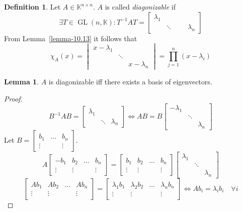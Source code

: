 \documentclass[a4paper,landscape,twocolumn]{article}
\theoremstyle{definition}
\newtheorem{defi}{Definition}
\newtheorem{lemma}{Lemma}
\begin{document}
\begin{defi}
  Let $A \in \mathbb K^{n\times n}$.
  $A$ is called \emph{diagonizable} if
  \[
    \exists T \in \operatorname{GL}(n, \mathbb K):
    T^{-1} AT = \begin{bmatrix}
      \lambda_1 &        & \\
                & \ddots &
                &        & \lambda_n
    \end{bmatrix}
  \]
  From Lemma~\ref{lemma-10.13} it follows that
  \[
    \chi_A(x) = \begin{vmatrix}
      x - \lambda_1 &        & \\
                    & \ddots & \\
                    &        & x - \lambda_n
    \end{vmatrix}
    = \prod_{j=1}^n (x - \lambda_i)
  \]
\end{defi}
\begin{lemma}
  \label{lemma-10.15}
  $A$ is diagonizable iff there exists a basis of eigenvectors.
\end{lemma}
\begin{proof}
  \[
    B^{-1} AB
    = \begin{bmatrix} \lambda_1 & & \\ & \ddots & \lambda_n \end{bmatrix}
    \Leftrightarrow AB = B \begin{bmatrix} -\lambda_1 & & \\ & \ddots & \\ & & \lambda_n \end{bmatrix}
  \]
  Let $B = \begin{bmatrix} b_1 & \ldots & b_n \\ \vdots &  & \vdots \end{bmatrix}$.
  \[
    A \begin{bmatrix}
      -b_1 & b_2 & \ldots & b_n \\
      \vdots & \vdots &   & \vdots
    \end{bmatrix}
    = \begin{bmatrix}
      b_1 & b_2 & \ldots & b_n \\
      \vdots & \vdots &   & \vdots
    \end{bmatrix}
    \begin{bmatrix}
      \lambda_1 &        & \\
                & \ddots & \\
                &        & \lambda_n
    \end{bmatrix}
  \] \[
    \begin{bmatrix}
      Ab_1 & Ab_2 & \ldots & Ab_n \\
      \vdots & \vdots &    & \vdots
    \end{bmatrix}
    = \begin{bmatrix}
      \lambda_1 b_1 & \lambda_2 b_2 & \ldots & \lambda_n b_n \\
      \vdots & \vdots &  & \vdots
    \end{bmatrix}
    \Leftrightarrow Ab_i = \lambda_i b_i \quad \forall i
  \]
\end{proof}
\end{document}
